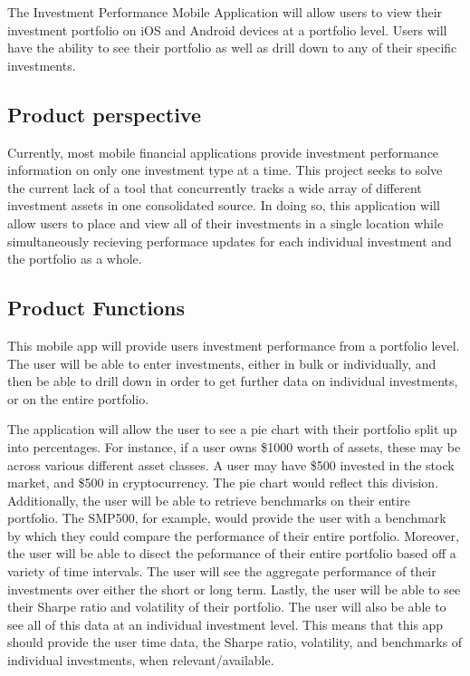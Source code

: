 \documentclass[onecolumn, draftclsnofoot,10pt, compsoc]{IEEEtran}
\begin{document}
The Investment Performance Mobile Application will allow users to view their investment portfolio on iOS and Android devices
at a portfolio level. Users will have the ability to see their portfolio as well as drill down to any of their specific investments.


\subsection{Product perspective}

Currently, most mobile financial applications provide investment performance information on only one investment type at a time. 
This project seeks to solve the current lack of a tool that concurrently tracks a wide array of different investment assets in 
one consolidated source. In doing so, this application will allow users to place and view all of their investments in a single location 
while simultaneously recieving performace updates for each individual investment and the portfolio as a whole.

\subsection{Product Functions}
This mobile app will provide users investment performance from a portfolio level. The user will be able to enter investments, either 
in bulk or individually, and then be able to drill down in order to get further data on individual investments, or on the entire portfolio.

The application will allow the user to see a pie chart with their portfolio split up into percentages. 
For instance, if a user owns \$1000 worth of assets, these may be across various different asset classes. A user may have \$500 invested in the stock market, 
and \$500 in cryptocurrency. The pie chart would reflect this division. Additionally, the user will be able to retrieve benchmarks on their entire portfolio. 
The SMP500, for example, would provide the user with a benchmark by which they could compare the performance of their entire portfolio. 
Moreover, the user will be able to disect the peformance of their entire portfolio based off a variety of time intervals. The user will see the aggregate 
performance of their investments over either the short or long term. Lastly, the user will be able to see their Sharpe ratio and volatility of their portfolio. 
The user will also be able to see all of this data at an individual investment level. This means that this app should provide the user 
time data, the Sharpe ratio, volatility, and benchmarks of individual investments, when relevant/available.
\end{document}
